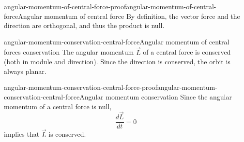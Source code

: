 \documentclass[preview]{standalone}
\begin{document}
\begin{snippetproof}{angular-momentum-of-central-force-proof}{angular-momentum-of-central-force}{Angular momentum of central force}
    By definition, the vector force and the direction are orthogonal, and thus the product is null.
\end{snippetproof}

\begin{snippetcorollary}{angular-momentum-conservation-central-force}{Angular momentum of central forces conservation}
    The angular momentum \(\vec{L}\) of a central force is conserved (both in module and direction).
    Since the direction is conserved, the orbit is always planar.
\end{snippetcorollary}

\begin{snippetproof}{angular-momentum-conservation-central-force-proof}{angular-momentum-conservation-central-force}{Angular momentum conservation}
    Since the angular momentum of a central force is null,
    \[
        \frac{d\vec{L}}{dt} = 0
    \]
    implies that \(\vec{L}\) is conserved.
\end{snippetproof}
\end{document}

